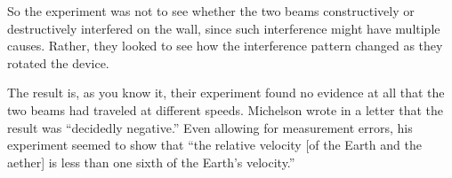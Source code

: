 \documentclass[../../main.tex]{subfiles}
\begin{document}
So the experiment was not to see whether the two beams constructively or destructively interfered on the wall, since such interference might have multiple causes. Rather, they looked to see how the interference pattern changed as they rotated the device. 

The result is, as you know it, their experiment found no evidence at all that the two beams had traveled at different speeds.  Michelson wrote in a letter that the result was “decidedly negative.” Even allowing for measurement errors, his experiment seemed to show that “the relative velocity [of the Earth and the aether] is less than one sixth of the Earth's velocity.”
\end{document}
